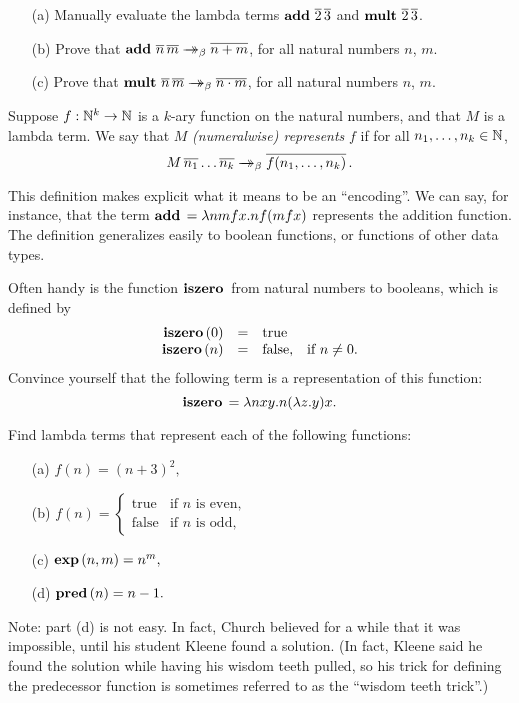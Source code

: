\documentclass{article}
\begin{document}
\begin{exercise}
  \begin{enumerate}
  \item[(a)] Manually evaluate the lambda terms
    $\mathop{\textbf{\bf add}\,}\mathop{\overline{2}}\mathop{\overline{3}}$ and $\mathop{\textbf{\bf mult}\,}\mathop{\overline{2}}\mathop{\overline{3}}$.
  \item[(b)] Prove that $\mathop{\textbf{\bf add}\,}\mathop{\overline{n}}\mathop{\overline{m}}\mathrel{\rightarrow\!\!\!\!\!\rightarrow}_{\beta}\mathop{\overline{n+m}}$,
    for all natural numbers $n$, $m$.
  \item[(c)] Prove that
    $\mathop{\textbf{\bf mult}\,}\mathop{\overline{n}}\mathop{\overline{m}}\mathrel{\rightarrow\!\!\!\!\!\rightarrow}_{\beta}\mathop{\overline{n\cdot m}}$, for all natural
    numbers $n$, $m$.
  \end{enumerate}
\end{exercise}

\begin{definition}
  Suppose $f:\mathbb{N}^k\to \mathbb{N}$ is a $k$-ary function on the natural numbers,
  and that $M$ is a lambda term. We say that $M$ {\em (numeralwise)
    represents} $f$ if for all $n_1,\ldots,n_k\in\mathbb{N}$,
  \[ M\mathop{\overline{n_1}}\ldots\mathop{\overline{n_k}} \mathrel{\rightarrow\!\!\!\!\!\rightarrow}_{\beta} \mathop{\overline{f(n_1,\ldots,n_k)}}.
  \]
\end{definition}

This definition makes explicit what it means to be an ``encoding''. We
can say, for instance, that the term $\mathop{\textbf{\bf add}\,} = \lambda nmfx.nf(mfx)$
represents the addition function.  The definition generalizes easily to
boolean functions, or functions of other data types.

Often handy is the function $\mathop{\textbf{\bf iszero}\,}$ from natural numbers to booleans, which
is defined by
\[ \begin{array}{rcll}
  \mathop{\textbf{\bf iszero}\,}(0) &=& \mbox{true} \\
  \mathop{\textbf{\bf iszero}\,}(n) &=& \mbox{false,} & \mbox{if $n\neq 0$.}
\end{array}
\]
Convince yourself that the following term is a representation of
this function:
\[ \mathop{\textbf{\bf iszero}\,} = \lambda nxy.n(\lambda z.y)x. \]

\begin{exercise}
  Find lambda terms that represent each of the following functions:
  \begin{enumerate}
  \item[(a)] 
    $ f(n)=(n+3)^2, $
  \item[(b)] 
    $  f(n)=\left\{\begin{array}{ll}\mbox{true}&\mbox{if
          $n$ is even,}\\\mbox{false}&\mbox{if $n$ is odd,}
      \end{array}\right. 
    $
  \item[(c)] 
    $ \mathop{\textbf{\bf exp}\,}(n,m)=n^m, $
  \item[(d)] 
    $ \mathop{\textbf{\bf pred}\,}(n)=n-1. $
  \end{enumerate}
  Note: part (d) is not easy. In fact, Church believed for a while
  that it was impossible, until his student Kleene found a solution.
  (In fact, Kleene said he found the solution while having his wisdom
  teeth pulled, so his trick for defining the predecessor function is
  sometimes referred to as the ``wisdom teeth trick''.)
\end{exercise}
\end{document}
